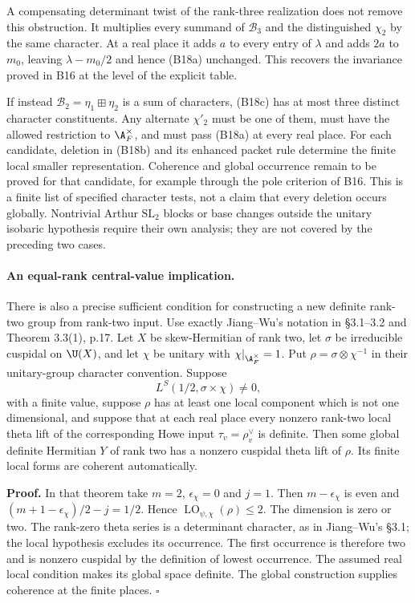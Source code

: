 A compensating determinant twist of the rank-three realization
does not remove this obstruction. It multiplies every summand
of $\mathcal B_3$ and the distinguished $\chi_2$ by the same
character. At a real place it adds $a$ to every entry of
$\lambda$ and adds $2a$ to $m_0$, leaving
$\lambda-m_0/2$ and hence (B18a) unchanged. This recovers the
invariance proved in B16 at the level of the explicit table.

If instead $\mathcal B_2=\eta_1\boxplus\eta_2$ is a sum of
characters, (B18c) has at most three distinct character
constituents. Any alternate $\chi'_2$ must be one of them,
must have the allowed restriction to $\A_F^\times$, and must
pass (B18a) at every real place. For each candidate, deletion
in (B18b) and its enhanced packet rule determine the finite
local smaller representation. Coherence and global occurrence
remain to be proved for that candidate, for example through
the pole criterion of B16. This is a finite list of specified
character tests, not a claim that every deletion occurs globally.
Nontrivial Arthur $\mathrm{SL}_2$ blocks or base changes outside
the unitary isobaric hypothesis require their own analysis;
they are not covered by the preceding two cases.

\paragraph{An equal-rank central-value implication.}
There is also a precise sufficient condition for constructing a
new definite rank-two group from rank-two input. Use exactly
Jiang--Wu's notation in \S3.1--3.2 and Theorem 3.3(1), p.17.
Let $X$ be skew-Hermitian of rank two, let $\sigma$ be irreducible
cuspidal on $\U(X)$, and let $\chi$ be unitary with
$\chi|_{\A_F^\times}=1$.
Put $\rho=\sigma\otimes\chi^{-1}$ in their unitary-group
character convention. Suppose
\[
 L^S(1/2,\sigma\times\chi)\ne0,
 \tag{B18d}
\]
with a finite value, suppose $\rho$ has at least one local
component which is not one dimensional, and suppose that
at each real place every nonzero rank-two local theta lift
of the corresponding Howe input $\tau_v=\rho_v^\vee$ is
definite. Then some global definite
Hermitian $Y$ of rank two has a nonzero cuspidal theta lift of
$\rho$. Its finite local forms are coherent automatically.

\textbf{Proof.}
In that theorem take $m=2$, $\epsilon_\chi=0$ and $j=1$.
Then $m-\epsilon_\chi$ is even and
$(m+1-\epsilon_\chi)/2-j=1/2$. Hence
$\operatorname{LO}_{\psi,\chi}(\rho)\leq2$.
The dimension is zero or two. The rank-zero theta series is
a determinant character, as in Jiang--Wu's \S3.1; the local
hypothesis excludes its occurrence. The first occurrence is
therefore two and is nonzero cuspidal by the definition of
lowest occurrence. The assumed real local condition makes its
global space definite. The global construction supplies
coherence at the finite places. \hfill$\square$

